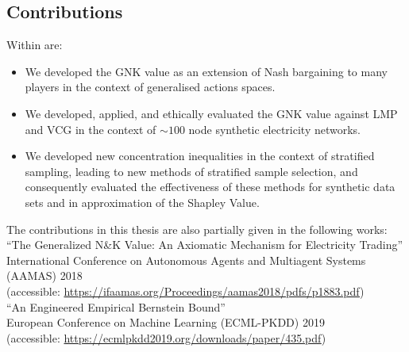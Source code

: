 \subsection{Contributions}

Within \DIFdelbegin {}\DIFdelend \DIFaddbegin {}\DIFaddend are:
\begin{itemize}
\item We developed the GNK value as an extension of Nash bargaining to many players in the context of generalised actions spaces.
\item We developed, applied, and ethically evaluated the GNK value against LMP and VCG in the context of $\sim 100$ node synthetic electricity networks.
\item We developed new concentration inequalities in the context of stratified sampling, leading to new methods of stratified sample selection, and consequently evaluated the effectiveness of these methods for synthetic data sets and in approximation of the Shapley Value.
\end{itemize}

\noindent The contributions in this thesis are also partially given in the following works:\\

\noindent``The Generalized N\&K Value: An Axiomatic Mechanism for Electricity Trading'' \DIFaddbegin {}\DIFaddend \\ International Conference on Autonomous Agents and Multiagent Systems\\ (AAMAS) 2018\\
(accessible: \DIFdelbegin %
\DIFdelend \DIFaddbegin \href{https://ifaamas.org/Proceedings/aamas2018/pdfs/p1883.pdf}{https://ifaamas.org/Proceedings/aamas2018/pdfs/p1883.pdf}\DIFaddend )\\


\noindent``An Engineered Empirical Bernstein Bound'' \DIFdelbegin \DIFdel{,}\DIFdelend \DIFaddbegin {}\DIFaddend \\ European Conference on Machine Learning (ECML-PKDD) 2019\\
(accessible: \DIFdelbegin %
\DIFdelend \DIFaddbegin \href{https://ecmlpkdd2019.org/downloads/paper/435.pdf}{https://ecmlpkdd2019.org/downloads/paper/435.pdf}\DIFaddend )\\


